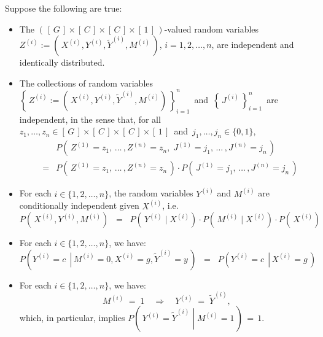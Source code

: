 \vskip 0.3cm
\noindent
Suppose the following are true:
\begin{itemize}
\item
	The $\left(\,\left[\,G\,\right] \times \left[\,C\,\right] \times \left[\,C\,\right] \times \left[\,1\,\right]\,\right)$-valued
	random variables
	$Z^{(i)} := \left(\,X^{(i)},Y^{(i)},\widetilde{Y}^{(i)},M^{(i)}\,\right)$,
	$i = 1, 2, \ldots, n$, are independent and identically distributed.
\item
	The collections of random variables
	\,$\left\{\,Z^{(i)} := \left(\,X^{(i)},Y^{(i)},\widetilde{Y}^{(i)},M^{(i)}\right)\,\right\}_{i=1}^{n}$\,
	and
	\,$\left\{\,J^{(i)}\,\right\}_{i=1}^{n}$\,
	are independent, in the sense that, for all
	\,$z_{1}, \ldots, z_{n} \in \left[\,G\,\right] \times \left[\,C\,\right] \times \left[\,C\,\right] \times \left[\,1\,\right]$\,
	and
	\,$j_{1}, \ldots, j_{n} \in \{0,1\}$,\,
	\begin{eqnarray*}
	&&
		P\!\left(\,Z^{(1)}=z_{1},\,\ldots\,,Z^{(n)}=z_{n},\;J^{(1)}=j_{1},\,\ldots\,,J^{(n)}=j_{n}\,\right)
	\\
	& = &
		P\!\left(\,Z^{(1)}=z_{1},\,\ldots\,,Z^{(n)}=z_{n}\,\right)
		\cdot
		P\!\left(\,J^{(1)}=j_{1},\,\ldots\,,J^{(n)}=j_{n}\,\right)
	\end{eqnarray*}
\item
	For each $i \in \{1,2,\ldots,n\}$, the random variables $Y^{(i)}$ and $M^{(i)}$
	are conditionally independent given $X^{(i)}$, i.e.
	\begin{equation*}
	P\!\left(\,X^{(i)},Y^{(i)},M^{(i)}\right)
	\;\; = \;\;
	P\!\left(\,Y^{(i)}\;\vert\;X^{(i)}\right) \cdot
	P\!\left(\,M^{(i)}\;\vert\;X^{(i)}\right) \cdot
	P\!\left(\,X^{(i)}\right)
	\end{equation*}
\item
	For each $i\in\{1,2,\ldots,n\}$, we have:
	\begin{equation*}
	P\!\left(\left.Y^{(i)} = c\,\;\right\vert\,M^{(i)}=0,X^{(i)}=g,\widetilde{Y}^{(i)}=y\,\right)
	\;\; = \;\;
	P\!\left(\left.Y^{(i)} = c\,\;\right\vert\,X^{(i)}=g\,\right)
	\end{equation*}
\item
	For each $i\in\{1,2,\ldots,n\}$, we have:
	\begin{equation*}
	M^{(i)} \; = \; 1
	\quad\Longrightarrow\quad
	Y^{(i)} \; = \; \widetilde{Y}^{(i)},
	\end{equation*}
	which, in particular, implies $P\!\left(\,\left.Y^{(i)} = \widetilde{Y}^{(i)}\;\right\vert\;M^{(i)}=1\,\right)\,=\,1$.
\end{itemize}
